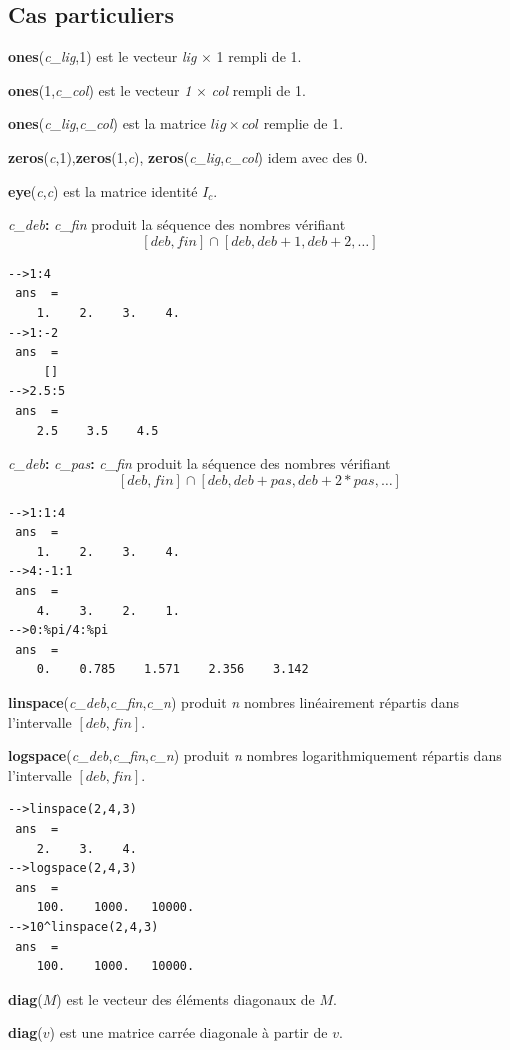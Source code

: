 \documentclass{article}
\begin{document}
\begin{multicols}{3}
\subsection{Cas particuliers}
\begin{description}
\item{\textbf{ones}(\textit{c\_lig},1)} est le vecteur \textit{lig} $\times$ 1 rempli de 1.
\item{\textbf{ones}(1,\textit{c\_col})} est le vecteur \textit{1} $\times$  \textit{col} rempli de 1.
\item{\textbf{ones}(\textit{c\_lig},\textit{c\_col})} est la matrice $lig \times col$ remplie de 1.
\item{\textbf{zeros}(\textit{c},1),\textbf{zeros}(1,\textit{c}), \textbf{zeros}(\textit{c\_lig},\textit{c\_col})}  idem avec des 0.
\item{\textbf{eye}(\textit{c},\textit{c})} est la matrice identité $I_{c}$.
\item{\textit{c\_deb}\textbf{:} \textit{c\_fin}} produit la séquence des nombres vérifiant
$$ [deb,fin] \cap [deb,deb+1,deb+2,\ldots]$$
\begin{verbatim}
-->1:4
 ans  =
    1.    2.    3.    4.  
-->1:-2
 ans  =
     []
-->2.5:5
 ans  =
    2.5    3.5    4.5 
\end{verbatim}
\item{\textit{c\_deb}\textbf{:} \textit{c\_pas}\textbf{:} \textit{c\_fin}} produit la séquence des nombres vérifiant
$$ [deb,fin] \cap [deb,deb+pas,deb+2*pas,\ldots]$$
\begin{verbatim}
-->1:1:4
 ans  =
    1.    2.    3.    4.  
-->4:-1:1
 ans  =
    4.    3.    2.    1.  
-->0:%pi/4:%pi
 ans  =
    0.    0.785    1.571    2.356    3.142
\end{verbatim}
\item{\textbf{linspace}(\textit{c\_deb},\textit{c\_fin},\textit{c\_n})} produit \textit{n} nombres linéairement répartis dans l'intervalle $[deb,fin]$.
\item{\textbf{logspace}(\textit{c\_deb},\textit{c\_fin},\textit{c\_n})}  produit \textit{n} nombres logarithmiquement répartis dans l'intervalle $[deb,fin]$.
\begin{verbatim}
-->linspace(2,4,3)
 ans  =
    2.    3.    4.  
-->logspace(2,4,3)
 ans  =
    100.    1000.   10000.
-->10^linspace(2,4,3)
 ans  =
    100.    1000.   10000. 
\end{verbatim}
\item{\textbf{diag}($M$)} est le vecteur des éléments diagonaux de $M$.
\item{\textbf{diag}($v$)} est une matrice carrée diagonale à partir de $v$.

\end{description}
\end{multicols}
\end{document}
